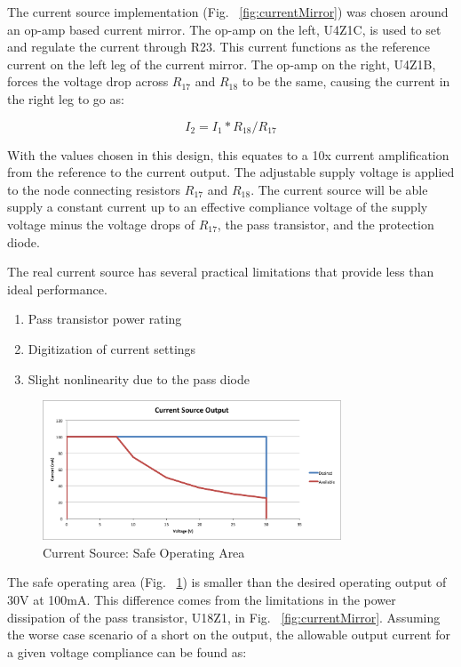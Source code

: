 \documentclass[journal]{IEEEtran}
\begin{document}
The current source implementation (Fig. ~\ref{fig:currentMirror}) was chosen around an op-amp based current mirror. The op-amp on the left, U4Z1C, is used to set and regulate the current through R23. This current functions as the reference current on the left leg of the current mirror. The op-amp on the right, U4Z1B, forces the voltage drop across $R_{17}$ and $R_{18}$ to be the same, causing the current in the right leg to go as:

\begin{equation}
I_2 = I_1*R_{18}/R_{17}
\end{equation}

With the values chosen in this design, this equates to a 10x current amplification from the reference to the current output. The adjustable supply voltage is applied to the node connecting resistors $R_{17}$ and $R_{18}$. The current source will be able supply a constant current up to an effective compliance voltage of the supply voltage minus the voltage drops of $R_{17}$, the pass transistor, and the protection diode.

The real current source has several practical limitations that provide less than ideal performance. 

\begin{enumerate}
\item Pass transistor power rating
\item Digitization of current settings
\item Slight nonlinearity due to the pass diode
\end{enumerate}


\begin{figure}[here]
\centering
\includegraphics[width=3.5in]{safeOpArea}
\caption{Current Source: Safe Operating Area}
\label{fig:safeOpArea}
\end{figure}

The safe operating area (Fig.  ~\ref{fig:safeOpArea}) is smaller than the desired operating output of 30V at 100mA. This difference comes from the limitations in the power dissipation of the pass transistor, U18Z1, in Fig. ~\ref{fig:currentMirror}. Assuming the worse case scenario of a short on the output, the allowable output current for a given voltage compliance can be found as:
\end{document}
